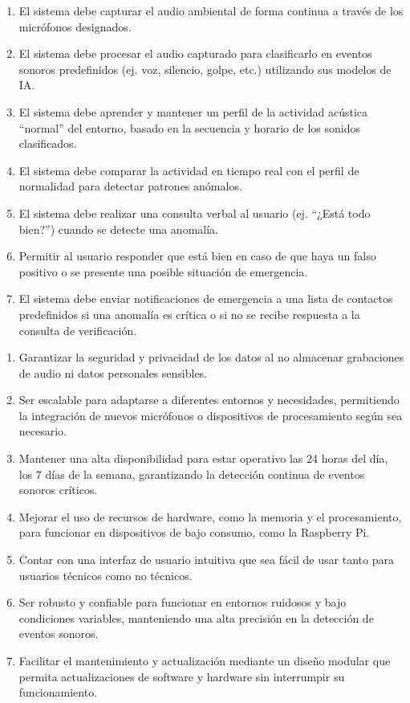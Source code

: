 
\begin{enumerate}
      \item El sistema debe capturar el audio ambiental de forma continua a través de los micrófonos designados.
      \item El sistema debe procesar el audio capturado para clasificarlo en eventos sonoros predefinidos (ej. voz, silencio, golpe, etc.) utilizando sus modelos de IA.
      \item El sistema debe aprender y mantener un perfil de la actividad acústica ``normal'' del entorno, basado en la secuencia y horario de los sonidos clasificados.
      \item El sistema debe comparar la actividad en tiempo real con el perfil de normalidad para detectar patrones anómalos.
      \item El sistema debe realizar una consulta verbal al usuario (ej. ``¿Está todo bien?'') cuando se detecte una anomalía.
      \item Permitir al usuario responder que está bien en caso de que haya un falso positivo o se presente una posible situación de emergencia.
      \item El sistema debe enviar notificaciones de emergencia a una lista de contactos predefinidos si una anomalía es crítica o si no se recibe respuesta a la consulta de verificación.
\end{enumerate}


\begin{enumerate}
      \item Garantizar la seguridad y privacidad de los datos al no almacenar grabaciones de audio ni datos personales sensibles.
      \item Ser escalable para adaptarse a diferentes entornos y necesidades, permitiendo la integración de nuevos micrófonos o dispositivos de procesamiento según sea necesario.
      \item Mantener una alta disponibilidad para estar operativo las 24 horas del día, los 7 días de la semana, garantizando la detección continua de eventos sonoros críticos.
      \item Mejorar el uso de recursos de hardware, como la memoria y el procesamiento, para funcionar en dispositivos de bajo consumo, como la Raspberry Pi.
      \item Contar con una interfaz de usuario intuitiva que sea fácil de usar tanto para usuarios técnicos como no técnicos.
      \item Ser robusto y confiable para funcionar en entornos ruidosos y bajo condiciones variables, manteniendo una alta precisión en la detección de eventos sonoros.
      \item Facilitar el mantenimiento y actualización mediante un diseño modular que permita actualizaciones de software y hardware sin interrumpir su funcionamiento.
\end{enumerate}

